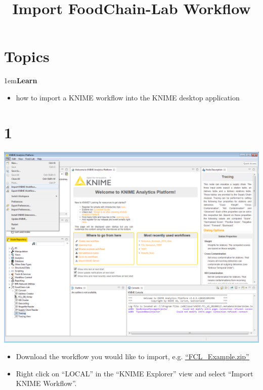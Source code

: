 \documentclass[10pt]{beamer}
\title{Import FoodChain-Lab Workflow}
\date{}
\begin{document}
\maketitle

\section{Topics}
\begin{frame}
\leftskip1em\textbf{Learn}
	\begin{itemize}
		\item how to import a KNIME workflow into the KNIME desktop application
	\end{itemize}
\end{frame}

\section{1}
\begin{frame}
	\begin{center}
  		\includegraphics[height=0.6\textheight]{1.png}
	\end{center}
	\begin{itemize}
		\item Download the workflow you would like to import, e.g.
    \textcolor{blue}{\underline{\href{https://github.com/SiLeBAT/BfROpenLabResources/raw/master/GitHubPages/workflows/FCL\_Example.zip}{``FCL\_Example.zip''}}}
		\item Right click on ``LOCAL'' in the ``KNIME Explorer'' view and select ``Import KNIME Workflow''.
	\end{itemize}
\end{frame}
\end{document}
